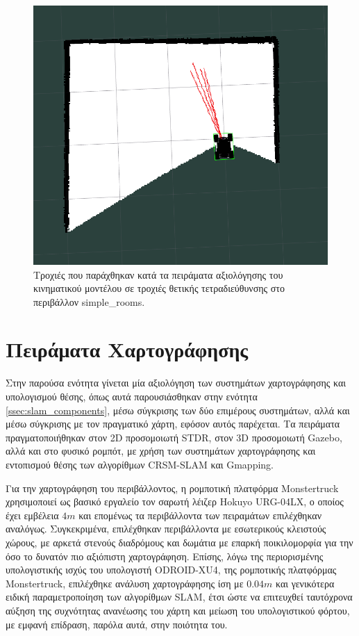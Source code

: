 \begin{figure}[!ht]
	\centering
	\includegraphics[width=0.6\linewidth]{Chapters/Chapter5/Figures/crab_steering_experiment.png}
	\caption{Τροχιές που παράχθηκαν κατά τα πειράματα αξιολόγησης του κινηματικού μοντέλου σε τροχιές θετικής τετραδιεύθυνσης στο περιβάλλον simple{\_}rooms.}
	\label{fig:crab_steering_experiment}
\end{figure}


\section{Πειράματα Χαρτογράφησης} \label{sec:slam_experiments}
Στην παρούσα ενότητα γίνεται μία αξιολόγηση των συστημάτων χαρτογράφησης και υπολογισμού θέσης, όπως αυτά παρουσιάσθηκαν στην ενότητα \ref{ssec:slam_components}, μέσω σύγκρισης των δύο επιμέρους συστημάτων, αλλά και μέσω σύγκρισης με τον πραγματικό χάρτη, εφόσον αυτός παρέχεται. Τα πειράματα πραγματοποιήθηκαν στον 2D προσομοιωτή STDR, στον 3D προσομοιωτή Gazebo, αλλά και στο φυσικό ρομπότ, με χρήση των συστημάτων χαρτογράφησης και εντοπισμού θέσης των αλγορίθμων CRSM-SLAM και Gmapping.

\bigskip
Για την χαρτογράφηση του περιβάλλοντος, η ρομποτική πλατφόρμα Monstertruck χρησιμοποιεί ως βασικό εργαλείο τον σαρωτή λέιζερ Hokuyo URG-04LX, ο οποίος έχει εμβέλεια $4m$ και επομένως τα περιβάλλοντα των πειραμάτων επιλέχθηκαν αναλόγως. Συγκεκριμένα, επιλέχθηκαν περιβάλλοντα με εσωτερικούς κλειστούς χώρους, με αρκετά στενούς διαδρόμους και δωμάτια με επαρκή ποικιλομορφία για την όσο το δυνατόν πιο αξιόπιστη χαρτογράφηση. Επίσης, λόγω της περιορισμένης υπολογιστικής ισχύς του υπολογιστή ODROID-XU4, της ρομποτικής πλατφόρμας Monstertruck, επιλέχθηκε ανάλυση χαρτογράφησης ίση με $0.04m$ και γενικότερα ειδική παραμετροποίηση των αλγορίθμων SLAM, έτσι ώστε να επιτευχθεί ταυτόχρονα αύξηση της συχνότητας ανανέωσης του χάρτη και μείωση του υπολογιστικού φόρτου, με εμφανή επίδραση, παρόλα αυτά, στην ποιότητα του.

